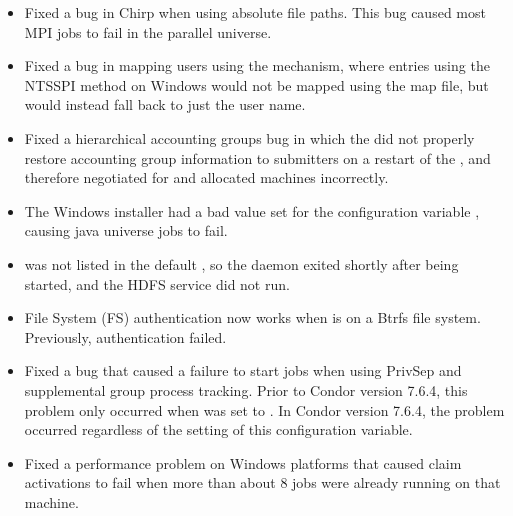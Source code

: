 \begin{itemize}



\item Fixed a bug in Chirp when using absolute file paths. This bug caused
most MPI jobs to fail in the parallel universe.

\item Fixed a bug in mapping users using the 
mechanism, where entries using the NTSSPI method on Windows would not be mapped
using the map file, but would instead fall back to just the user name.

\item Fixed a hierarchical accounting groups bug in which
the  did not properly restore accounting group 
information to submitters on a restart of the ,
and therefore negotiated for and allocated machines incorrectly.

\item The Windows installer had a bad value set for the configuration variable
, causing java universe jobs to fail. 

\item {} was not listed in the default
, so the  daemon exited
shortly after being started,
and the HDFS service did not run.

\item File System (FS) authentication now works when  
is on a Btrfs file system.  Previously, authentication failed.

\item Fixed a bug that caused a failure to start jobs when using PrivSep
and supplemental group process tracking.  
Prior to Condor version 7.6.4, this problem
only occurred when  was set
to .  
In Condor version 7.6.4, the problem occurred regardless of the setting
of this configuration variable.

\item Fixed a performance problem on Windows platforms
that caused claim activations to
fail when more than about 8 jobs were already running on that machine.


\end{itemize}

